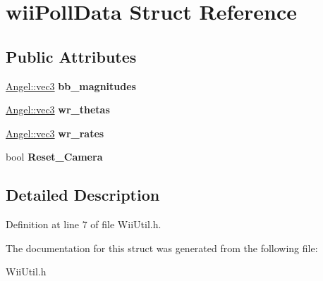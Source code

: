 \hypertarget{structwii_poll_data}{\section{wii\-Poll\-Data Struct Reference}
\label{structwii_poll_data}
}
\subsection*{Public Attributes}
\begin{DoxyCompactItemize}
\item 
\hypertarget{structwii_poll_data_ad2a9be1946c67bd0da3de42dee26926a}{\hyperlink{struct_angel_1_1vec3}{Angel\-::vec3} {\bfseries bb\-\_\-magnitudes}}\label{structwii_poll_data_ad2a9be1946c67bd0da3de42dee26926a}

\item 
\hypertarget{structwii_poll_data_a9d7ad57a394cbae0d84285888a04c4ec}{\hyperlink{struct_angel_1_1vec3}{Angel\-::vec3} {\bfseries wr\-\_\-thetas}}\label{structwii_poll_data_a9d7ad57a394cbae0d84285888a04c4ec}

\item 
\hypertarget{structwii_poll_data_a794e2a15344966d546c3f02f3470a3af}{\hyperlink{struct_angel_1_1vec3}{Angel\-::vec3} {\bfseries wr\-\_\-rates}}\label{structwii_poll_data_a794e2a15344966d546c3f02f3470a3af}

\item 
\hypertarget{structwii_poll_data_af06c440335fec68bfa22d3601e050d2e}{bool {\bfseries Reset\-\_\-\-Camera}}\label{structwii_poll_data_af06c440335fec68bfa22d3601e050d2e}

\end{DoxyCompactItemize}


\subsection{Detailed Description}


Definition at line 7 of file Wii\-Util.\-h.



The documentation for this struct was generated from the following file\-:\begin{DoxyCompactItemize}
\item 
Wii\-Util.\-h\end{DoxyCompactItemize}
